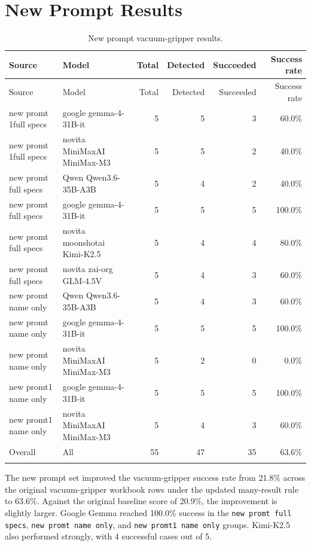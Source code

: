 \documentclass[11pt,a4paper]{article}
\begin{document}
\section{New Prompt Results}

\clearpage
\begingroup
\small
\setlength{\tabcolsep}{3pt}
\begin{longtable}{L{3.0cm}L{4.5cm}rrrr}
\toprule
Source & Model & Total & Detected & Succeeded & Success rate \\
\midrule
\endfirsthead
\toprule
Source & Model & Total & Detected & Succeeded & Success rate \\
\midrule
\endhead
new promt 1full specs & google gemma-4-31B-it & 5 & 5 & 3 & 60.0\% \\
new promt 1full specs & novita MiniMaxAI MiniMax-M3 & 5 & 5 & 2 & 40.0\% \\
new promt full specs & Qwen Qwen3.6-35B-A3B & 5 & 4 & 2 & 40.0\% \\
new promt full specs & google gemma-4-31B-it & 5 & 5 & 5 & 100.0\% \\
new promt full specs & novita moonshotai Kimi-K2.5 & 5 & 4 & 4 & 80.0\% \\
new promt full specs & novita zai-org GLM-4.5V & 5 & 4 & 3 & 60.0\% \\
new promt name only & Qwen Qwen3.6-35B-A3B & 5 & 4 & 3 & 60.0\% \\
new promt name only & google gemma-4-31B-it & 5 & 5 & 5 & 100.0\% \\
new promt name only & novita MiniMaxAI MiniMax-M3 & 5 & 2 & 0 & 0.0\% \\
new promt1 name only & google gemma-4-31B-it & 5 & 5 & 5 & 100.0\% \\
new promt1 name only & novita MiniMaxAI MiniMax-M3 & 5 & 4 & 3 & 60.0\% \\
\midrule
Overall & All & 55 & 47 & 35 & 63.6\% \\
\bottomrule
\caption{New prompt vacuum-gripper results.}
\end{longtable}
\endgroup

The new prompt set improved the vacuum-gripper success rate from 21.8\% across the original vacuum-gripper workbook rows under the updated many-result rule to 63.6\%. Against the original baseline score of 20.9\%, the improvement is slightly larger. Google Gemma reached 100.0\% success in the \texttt{new promt full specs}, \texttt{new promt name only}, and \texttt{new promt1 name only} groups. Kimi-K2.5 also performed strongly, with 4 successful cases out of 5.
\end{document}
